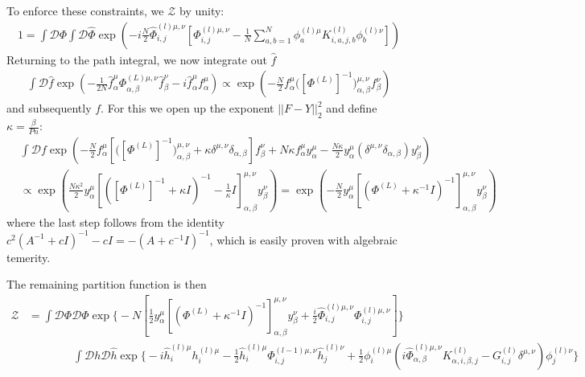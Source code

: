 \documentclass[../main.tex]{subfiles}
\begin{document}
To enforce these constraints, we  $\mathcal Z$ by unity:
\begin{align*}
  1 
  = \int \mathcal D \Phi \int \mathcal D \hat \Phi \exp \left(
    -i \frac{N}{2} \hat \Phi^{(l)\mu,\nu}_{i,j} \left[
      \Phi^{(l)\mu,\nu}_{i,j} - \frac1N \sum_{a,b=1}^N \phi^{(l)\mu}_{a} K^{(l)}_{i,a,j,b} \phi^{(l)\nu}_{b}
    \right]
  \right) 
\end{align*}
Returning to the path integral, we now integrate out $\hat f$
\begin{align*}
  \int \mathcal{D} \hat f \exp \left(
    - \frac{1}{2N} \hat f^{\mu}_{\alpha} \Phi^{(L)\mu,\nu}_{\alpha,\beta} \hat f^{\nu}_{\beta}
    -i \hat f^{\mu}_{\alpha} f^{\mu}_{\alpha} 
  \right)
  \propto 
  \exp \left(
    -\frac{N}{2} f^{\mu}_{\alpha} \big([\Phi^{(L)}]^{-1}\big)^{\mu,\nu}_{\alpha,\beta} f^{\nu}_{\beta}
  \right)
\end{align*}
and subsequently $f$. For this we open up the  exponent $||F-Y||^2_2$ and define $\kappa = \frac{\beta}{Pn}$:
\begin{align*}
  & \int \mathcal{D} f \exp \left(
    -\frac{N}{2} f^{\mu}_{\alpha} \left[
      \big([\Phi^{(L)}]^{-1}\big)^{\mu,\nu}_{\alpha,\beta} 
      + \kappa \delta^{\mu,\nu} \delta_{\alpha,\beta}
    \right]
    f^{\nu}_{\beta}
    + N \kappa f^{\mu}_{\alpha} y^{\mu}_{\alpha}
    - \frac{N \kappa}{2} y^{\mu}_{\alpha} (\delta^{\mu,\nu} \delta_{\alpha,\beta}) y^{\nu}_{\beta}
  \right) \\
  & \propto
  \exp \left(
    \frac{N \kappa^2}{2} y^{\mu}_{\alpha} \left[
      (
        [\Phi^{(L)}]^{-1} 
        + \kappa I
      )^{-1}
      - \frac{1}{\kappa} I
    \right]^{\mu,\nu}_{\alpha,\beta} 
    y^{\nu}_{\beta}
  \right)
  =
  \exp \left(
    -\frac{N}{2} y^{\mu}_{\alpha} \left[
      (\Phi^{(L)}
      + \kappa^{-1} I)^{-1}
    \right]^{\mu,\nu}_{\alpha,\beta} 
    y^{\nu}_{\beta}
  \right)
\end{align*}
where the last step follows from the identity $c^2 (A^{-1} + cI)^{-1} - c I = -(A + c^{-1} I)^{-1}$, which is easily proven with algebraic temerity.

The remaining partition function is then
\begin{align*}
  \mathcal Z &=
    \int \mathcal{D} \Phi \mathcal{D} \hat \Phi
    \exp \Bigg \{
     -N \left[
      \frac12 y^{\mu}_{\alpha} \left[ (\Phi^{(L)} + \kappa^{-1} I )^{-1} \right]^{\mu,\nu}_{\alpha,\beta} y^{\nu}_{\beta}
      + \frac{i}{2} \hat \Phi^{(l)\mu,\nu}_{i,j} \Phi^{(l)\mu,\nu}_{i,j}
     \right]
    \Bigg \} \\
    & \qquad \qquad
    \int \mathcal{D} h \mathcal{D} \hat h
    \exp \Bigg \{
      - i \hat h^{(l)\mu}_{i} h^{(l)\mu}_{i} 
      - \frac12 \hat h^{(l)\mu}_{i} \Phi^{(l-1)\mu,\nu}_{i,j} \hat h^{(l)\nu}_{j}
      + \frac12 \phi^{(l)\mu}_{i} \left( i \hat \Phi^{(l)\mu,\nu}_{\alpha,\beta} K^{(l)}_{\alpha,i,\beta,j} - G^{(l)}_{i,j} \delta^{\mu,\nu}  \right) \phi^{(l)\nu}_{j}
    \Bigg \}
\end{align*}
\end{document}

